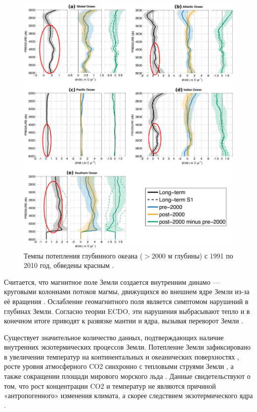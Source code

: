 \documentclass[10pt,twocolumn,letterpaper]{article}
\begin{document}
\begin{figure}[t]
\begin{center}
   \includegraphics[width=1\linewidth]{ocean-highlight.jpg}
\end{center}
   \caption{Темпы потепления глубинного океана ($>$2000 м глубины) с 1991 по 2010 год, обведены красным \cite{132}.}
\label{fig:15}
\label{fig:onecol}
\end{figure}

Считается, что магнитное поле Земли создается внутренним динамо — круговыми колоннами потоков магмы, движущихся во внешнем ядре Земли из-за её вращения \cite{123}. Ослабление геомагнитного поля является симптомом нарушений в глубинах Земли. Согласно теории ECDO, эти нарушения выбрасывают тепло и в конечном итоге приводят к развязке мантии и ядра, вызывая переворот Земли \cite{1}.

Существует значительное количество данных, подтверждающих наличие внутренних экзотермических процессов Земли. Потепление Земли зафиксировано в увеличении температур на континентальных и океанических поверхностях \cite{127,128}, росте уровня атмосферного CO2 синхронно с тепловыми струями Земли \cite{129,130}, а также сокращении площади мирового морского льда \cite{131}. Данные свидетельствуют о том, что рост концентрации CO2 и температур не являются причиной «антропогенного» изменения климата, а скорее следствием экзотермического ядра \cite{129}.
\end{document}
